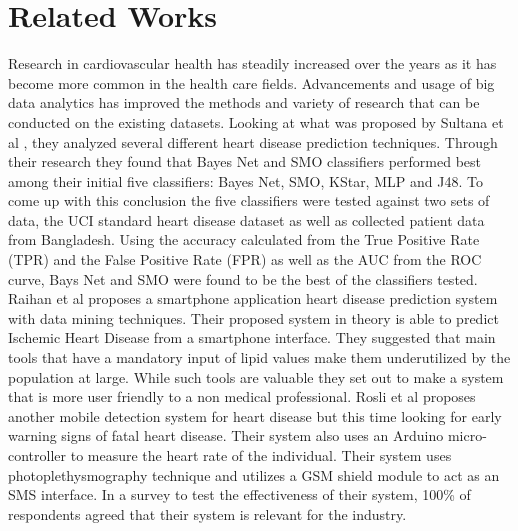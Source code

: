 \documentclass[conference]{IEEEtran}
\begin{document}
\section{Related Works}
Research in cardiovascular health has steadily increased over the years as it has become more common in the health care fields. Advancements and usage of big data analytics has improved the methods and variety of research that can be conducted on the existing datasets. 
Looking at what was proposed by Sultana et al \cite{7873142}, they analyzed several different heart disease prediction techniques. Through their research they found that Bayes Net and SMO classifiers performed best among their initial five classifiers: Bayes Net, SMO, KStar, MLP and J48. To come up with this conclusion the five classifiers were tested against two sets of data, the UCI standard heart disease dataset as well as collected patient data from Bangladesh. Using the accuracy calculated from the True Positive Rate (TPR) and the False Positive Rate (FPR) as well as the AUC from the ROC curve, Bays Net and SMO were found to be the best of the classifiers tested.
   Raihan et al \cite{7860213} proposes a smartphone application heart disease prediction system with data mining techniques. Their proposed system in theory is able to predict Ischemic Heart Disease from a smartphone interface. They suggested that main tools that have a mandatory input of lipid values make them underutilized by the population at large. While such tools are valuable they set out to make a system that is more user friendly to a non medical professional. 
   Rosli et al \cite{7808353} proposes another mobile detection system for heart disease but this time looking for early warning signs of fatal heart disease. Their system also uses an Arduino micro-controller to measure the heart rate of the individual. Their system uses photoplethysmography technique and utilizes a GSM shield module to act as an SMS interface. In a survey to test the effectiveness of their system, 100\% of respondents agreed that their system is relevant for the industry.
\end{document}
